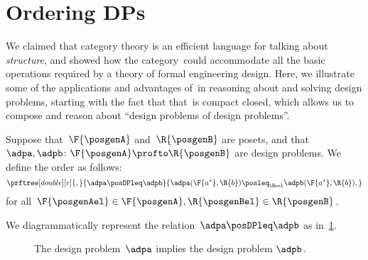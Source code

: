 

\section{Ordering DPs}\label{sec:ordering-order}
We claimed that category theory is an efficient language for talking about \emph{structure}, and showed how the category~\DP could accommodate all the basic operations required by a theory of formal engineering design.
Here, we illustrate some of the applications and advantages of~\DP in reasoning about and solving design problems, starting with the fact that that~\DP is compact closed, which allows us to compose and reason about ``design problems of design problems''.


\begin{definition}[Order on~\DP]
    \label{def:DP_loc_pos}
    Suppose that~$\F{\posgenA}$ and~$\R{\posgenB}$ are posets, and that~$\adpa,\adpb \colon \F{\posgenA} \profto \R{\posgenB}$ are design problems.
    We define the order as follows:
    \begin{equation*}
        \prftree[double][r]{,}{
            \adpa \posDPleq \adpb
        }{
            \adpa(\F{a^*},\R{b}) \posleq_\Bool \adpb(\F{a^*},\R{b}),
        }
    \end{equation*}
    for all~$\F{\posgenAel} \in \F{\posgenA},\R{\posgenBel} \in \R{\posgenB}$.
\end{definition}

We diagrammatically represent the relation~$\adpa \posDPleq \adpb$ as in~\cref{fig:dpimplies}.



\begin{figure}[h!]
	\centering
	\caption{The design problem~$\adpa$ implies the design problem $\adpb$.}
	\label{fig:dpimplies}
\end{figure}

